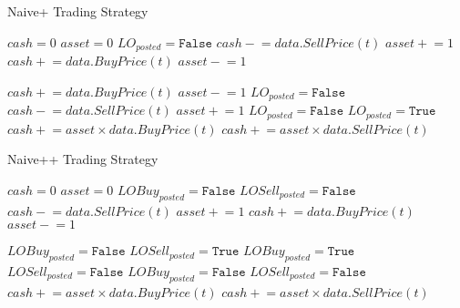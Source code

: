 \documentclass[12pt]{article}
\newcommand{\pluseq}{\mathrel{+}=}
\newcommand{\mineq}{\mathrel{-}=}
\begin{document}
\begin{algorithm}
\caption{Naive+ Trading Strategy}
\begin{algorithmic}[1]
\State $cash = 0$
\State $asset = 0$
\State $LO_{posted} = \texttt{False}$
				\State $cash \mineq data.SellPrice(\textit{t})$	
				\State $asset \pluseq 1$
				\State $cash \pluseq data.BuyPrice(\textit{t})$
				\State $asset \mineq 1$
			\EndIf
		\EndFor
	\EndIf

		\State $cash \pluseq data.BuyPrice(\textit{t})$
		\State $asset \mineq 1$
		\State $LO_{posted} = \texttt{False}$
		\State $cash \mineq data.SellPrice(\textit{t})$	
		\State $asset \pluseq 1$
		\State $LO_{posted} = \texttt{False}$
		\State $LO_{posted} = \texttt{True}$
	\EndIf
\EndFor
{} 
\State $cash \pluseq asset \times data.BuyPrice(\textit{t})$
\State $cash \pluseq asset \times data.SellPrice(\textit{t})$	
\EndIf
\end{algorithmic}
\end{algorithm}

\begin{algorithm}
\caption{Naive++ Trading Strategy}
\begin{algorithmic}[1]
\State $cash = 0$
\State $asset = 0$
\State $LOBuy_{posted} = \texttt{False}$
\State $LOSell_{posted} = \texttt{False}$
			\State $cash \mineq data.SellPrice(\textit{t})$	
			\State $asset \pluseq 1$
			\State $cash \pluseq data.BuyPrice(\textit{t})$
			\State $asset \mineq 1$
		\EndIf
	\EndFor

		\State $LOBuy_{posted} = \texttt{False}$
		\State $LOSell_{posted} = \texttt{True}$
		\State $LOBuy_{posted} = \texttt{True}$
		\State $LOSell_{posted} = \texttt{False}$
		\State $LOBuy_{posted} = \texttt{False}$
		\State $LOSell_{posted} = \texttt{False}$
	\EndIf
\EndFor
{} 
\State $cash \pluseq asset \times data.BuyPrice(\textit{t})$
\State $cash \pluseq asset \times data.SellPrice(\textit{t})$	
\EndIf
\end{algorithmic}
\end{algorithm}
\end{document}

